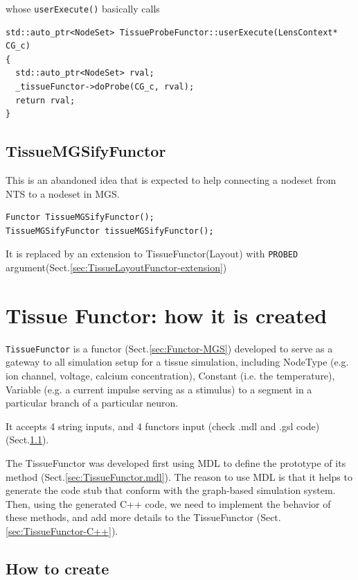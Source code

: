 whose \verb!userExecute()! basically calls
\begin{verbatim}
std::auto_ptr<NodeSet> TissueProbeFunctor::userExecute(LensContext* CG_c) 
{
  std::auto_ptr<NodeSet> rval;
  _tissueFunctor->doProbe(CG_c, rval);
  return rval;
}
\end{verbatim}


\subsection{TissueMGSifyFunctor}
\label{sec:TissueMGSifyFunctor}


This is an abandoned idea that is expected to help connecting a nodeset from NTS
to a nodeset in MGS.  
\begin{verbatim}
Functor TissueMGSifyFunctor();
TissueMGSifyFunctor tissueMGSifyFunctor();
\end{verbatim}

It is replaced by an extension to TissueFunctor(Layout) with \verb!PROBED!
argument(Sect.\ref{sec:TissueLayoutFunctor-extension})



\section{Tissue Functor: how it is created}
\label{sec:TissueFunctor}

\verb!TissueFunctor! is a functor (Sect.\ref{sec:Functor-MGS}) developed 
to serve as a gateway to all simulation setup for a tissue simulation,
including NodeType (e.g. ion channel, voltage, calcium concentration), Constant
(i.e. the temperature), Variable (e.g. a current impulse serving as a stimulus)
to a segment in a particular branch of a particular neuron.

It accepts 4 string inputs, and 4 functors input (check .mdl and .gsl code)
(Sect.\ref{sec:TissueFunctor-how-to-create}).

The TissueFunctor was developed first using MDL to define the prototype of its
method (Sect.\ref{sec:TissueFunctor.mdl}). The reason to use MDL is that it
helps to generate the code stub that conform with the graph-based simulation
system. Then, using the generated C++ code, we need to implement the behavior
of these methods, and add more details to the TissueFunctor
(Sect.\ref{sec:TissueFunctor-C++}).


\subsection{How to create}
\label{sec:TissueFunctor-how-to-create}

